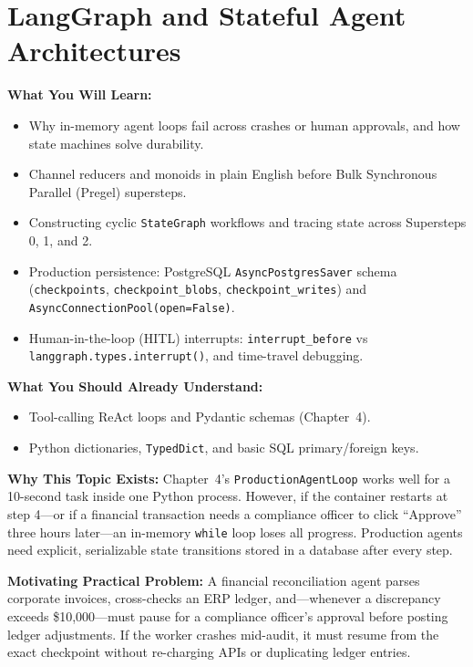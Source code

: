 \chapter{LangGraph and Stateful Agent Architectures}
\label{chap:langgraph}

\begin{chaptergoalsbox}
\textbf{What You Will Learn:}
\begin{itemize}[leftmargin=15pt]
  \item Why in-memory agent loops fail across crashes or human approvals, and how state machines solve durability.
  \item Channel reducers and monoids in plain English before Bulk Synchronous Parallel (Pregel) supersteps.
  \item Constructing cyclic \texttt{StateGraph} workflows and tracing state across Supersteps 0, 1, and 2.
  \item Production persistence: PostgreSQL \texttt{AsyncPostgresSaver} schema (\texttt{checkpoints}, \texttt{checkpoint\_blobs}, \texttt{checkpoint\_writes}) and \texttt{AsyncConnectionPool(open=False)}.
  \item Human-in-the-loop (HITL) interrupts: \texttt{interrupt\_before} vs \texttt{langgraph.types.interrupt()}, and time-travel debugging.
\end{itemize}

\textbf{What You Should Already Understand:}
\begin{itemize}[leftmargin=15pt]
  \item Tool-calling ReAct loops and Pydantic schemas (Chapter~4).
  \item Python dictionaries, \texttt{TypedDict}, and basic SQL primary/foreign keys.
\end{itemize}

\textbf{Why This Topic Exists:}
Chapter~4's \texttt{ProductionAgentLoop} works well for a 10-second task inside one Python process. However, if the container restarts at step 4—or if a financial transaction needs a compliance officer to click ``Approve'' three hours later—an in-memory \texttt{while} loop loses all progress. Production agents need explicit, serializable state transitions stored in a database after every step.

\textbf{Motivating Practical Problem:}
A financial reconciliation agent parses corporate invoices, cross-checks an ERP ledger, and—whenever a discrepancy exceeds \$10,000—must pause for a compliance officer's approval before posting ledger adjustments. If the worker crashes mid-audit, it must resume from the exact checkpoint without re-charging APIs or duplicating ledger entries.
\end{chaptergoalsbox}

